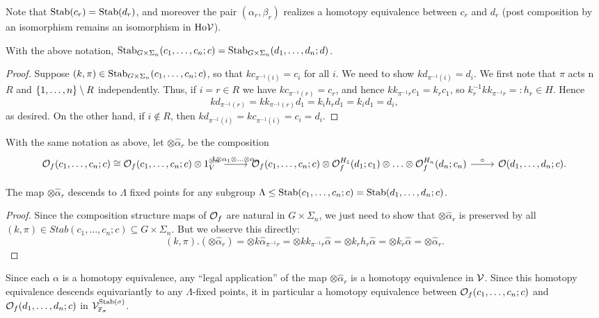 \documentclass[psamsfonts,onesided,10pt,letterpaper]{amsart}%
\newcommand{\Vsigma}{\ensuremath{\V^{\Stab(\sigma)}_{\F_\sigma}}}
\begin{document}
Note that $\mathrm{Stab}(c_r) = \mathrm{Stab}(d_r)$, and moreover the pair $(\alpha_r,\beta_r)$ realizes a homotopy equivalence between $c_r$ and $d_r$ (post composition by an isomorphism remains an isomorphism in $\mathrm{Ho}\mathcal V$). 

\begin{lemma}
  With the above notation, $\mathrm{Stab}_{G\times \Sigma_n}(c_1,\ldots, c_n;c) = \mathrm{Stab}_{G\times\Sigma_n}(d_1,\ldots, d_n;d)$. 
\end{lemma}
\begin{proof}
  Suppose $(k,\pi)\in \mathrm{Stab}_{G\times \Sigma_n}(c_1,\ldots, c_n;c)$, so that $kc_{\pi^{-1}(i)}= c_i$ for all $i$. We need to show $kd_{\pi^{-1}(i)} = d_i$. We first note that $\pi$ acts n $R$ and $\left\{1,\ldots, n\right\}\setminus R$ independently. Thus, if $i=r\in R$ we have $k c_{\pi^{-1}(r)} = c_r$, and hence $k k_{\pi^{-1}r}c_1 = k_r c_1$, so $k_r^{-1} k k_{\pi^{-1}r} =:h_r \in H$. Hence 
\[
k d_{\pi^{-1}(r)} = k k_{\pi^{-1}(r)} d_1 = k_i h_r d_1 = k_i d_1 = d_i,
\]
as desired. On the other hand, if $i\not\in R$, then $k d_{\pi^{-1}(i)} = k c_{\pi^{-1}(i)} = c_i = d_i$. 
\end{proof}

With the same notation as above, let $\otimes \hat\alpha_r$ be the composition
\[
\begin{tikzcd}
  \O_f(c_1,\ldots, c_n;c) \cong \O_f(c_1,\ldots, c_n;c) \otimes 1_V^{\otimes n} \arrow[r, "1\otimes \alpha_1 \otimes\ldots\otimes\alpha_n"] & \O_f(c_1,\ldots,c_n;c) \otimes \O_f^{H_1}(d_1;c_1)\otimes\ldots\otimes\O_f^{H_n}(d_n;c_n) \arrow[r,"\circ"] & \O(d_1,\ldots,d_n;c).
\end{tikzcd}
\]

\begin{lemma}
  The map $\otimes\hat\alpha_r$ descends to $\Lambda$ fixed points for any subgroup $\Lambda\leq \mathrm{Stab}(c_1,\ldots, c_n;c) = \mathrm{Stab}(d_1,\ldots,d_n;c)$.
\end{lemma}
\begin{proof}
  Since the composition structure maps of $\mathcal{O}_f$ are natural in $G\times\Sigma_n$, we just need to show that $\otimes \hat\alpha_r$ is preserved by all $(k,\pi)\in Stab(c_1,\ldots, c_n;c)\subseteq G\times \Sigma_n$. But we observe this directly:
\[
(k,\pi).(\otimes \hat\alpha_r) = \otimes k\hat\alpha_{\pi^{-1}r} = \otimes k k_{\pi^{-1}r}\hat\alpha = \otimes k_r h_r\hat\alpha = \otimes k_r\hat\alpha = \otimes \hat\alpha_r.
\]
\end{proof}

Since each $\alpha$ is a homotopy equivalence, any ``legal application'' of the map $\otimes \hat\alpha_r$ is a homotopy equivalence in $\mathcal V$. Since this homotopy equivalence descends equivariantly to any $\Lambda$-fixed points, it in particular a homotopy equivalence between $\mathcal{O}_f(c_1,\ldots,c_n;c)$ and $\mathcal{O}_f(d_1,\ldots,d_n;c)$ in $\Vsigma$.
\end{document}
